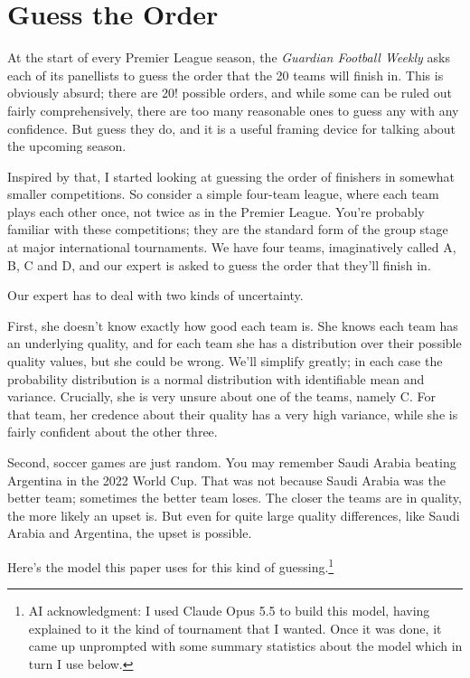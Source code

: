 \documentclass[
  11pt,
  letterpaper,
  DIV=11,
  numbers=noendperiod,
  twoside]{scrartcl}
\begin{document}
\section{Guess the Order}\label{sec-order}

At the start of every Premier League season, the \emph{Guardian Football
Weekly} asks each of its panellists to guess the order that the 20 teams
will finish in. This is obviously absurd; there are 20! possible orders,
and while some can be ruled out fairly comprehensively, there are too
many reasonable ones to guess any with any confidence. But guess they
do, and it is a useful framing device for talking about the upcoming
season.

Inspired by that, I started looking at guessing the order of finishers
in somewhat smaller competitions. So consider a simple four-team league,
where each team plays each other once, not twice as in the Premier
League. You're probably familiar with these competitions; they are the
standard form of the group stage at major international tournaments. We
have four teams, imaginatively called A, B, C and D, and our expert is
asked to guess the order that they'll finish in.

Our expert has to deal with two kinds of uncertainty.

First, she doesn't know exactly how good each team is. She knows each
team has an underlying quality, and for each team she has a distribution
over their possible quality values, but she could be wrong. We'll
simplify greatly; in each case the probability distribution is a normal
distribution with identifiable mean and variance. Crucially, she is very
unsure about one of the teams, namely C. For that team, her credence
about their quality has a very high variance, while she is fairly
confident about the other three.

Second, soccer games are just random. You may remember Saudi Arabia
beating Argentina in the 2022 World Cup. That was not because Saudi
Arabia was the better team; sometimes the better team loses. The closer
the teams are in quality, the more likely an upset is. But even for
quite large quality differences, like Saudi Arabia and Argentina, the
upset is possible.

Here's the model this paper uses for this kind of guessing.\footnote{AI
  acknowledgment: I used Claude Opus 5.5 to build this model, having
  explained to it the kind of tournament that I wanted. Once it was
  done, it came up unprompted with some summary statistics about the
  model which in turn I use below.}
\end{document}
